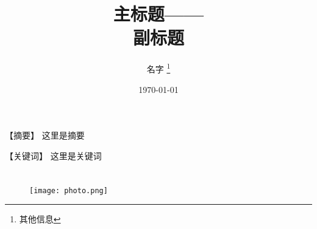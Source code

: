 \documentclass[12pt, oneside, a4paper]{ctexart}
\title{\textbf{主标题—— \\ \large 副标题}}
\author{名字 \thanks{其他信息}}
\date{\today}
\begin{document}
\maketitle

\noindent
\begin{flushleft}
  \setlength{\parindent}{0pt}
  \small
  {\heiti【摘要】} 这里是摘要
  \par
  {\heiti【关键词】} 这里是关键词
  \normalsize
\end{flushleft}

\section{\textbf{}}

\begin{figure}[H]
  \centering
  \texttt{[image: photo.png]}
  \caption{}
  \label{fig:1}
\end{figure}


\end{document}
